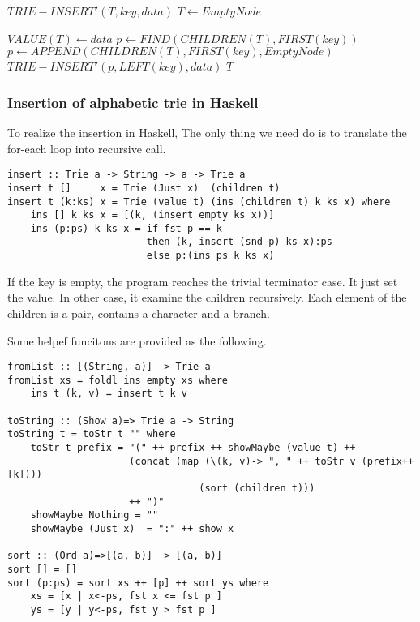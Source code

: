 \documentclass{article}
\begin{document}
\begin{algorithmic}
\STATE $TRIE-INSERT'(T, key, data)$
  \STATE $T \leftarrow EmptyNode$ \ENDIF

  \STATE $VALUE(T) \leftarrow data$
\ELSE
  \STATE $p \leftarrow FIND(CHILDREN(T), FIRST(key))$
    \STATE $p \leftarrow APPEND(CHILDREN(T), FIRST(key), EmptyNode)$
  \ENDIF
  \STATE $TRIE-INSERT'(p, LEFT(key), data)$
\ENDIF
\RETURN $T$
\end{algorithmic}

\subsubsection*{Insertion of alphabetic trie in Haskell}
To realize the insertion in Haskell, The only thing we need do is
to translate the for-each loop into recursive call. 

\lstset{language=Haskell}
\begin{lstlisting}
insert :: Trie a -> String -> a -> Trie a
insert t []     x = Trie (Just x)  (children t)
insert t (k:ks) x = Trie (value t) (ins (children t) k ks x) where
    ins [] k ks x = [(k, (insert empty ks x))]
    ins (p:ps) k ks x = if fst p == k 
                        then (k, insert (snd p) ks x):ps
                        else p:(ins ps k ks x)
\end{lstlisting}

If the key is empty, the program reaches the trivial terminator case.
It just set the value. In other case, it examine the children recursively.
Each element of the children is a pair, contains a character and
a branch. 

Some helpef funcitons are provided as the following.

\begin{lstlisting}
fromList :: [(String, a)] -> Trie a
fromList xs = foldl ins empty xs where
    ins t (k, v) = insert t k v

toString :: (Show a)=> Trie a -> String
toString t = toStr t "" where
    toStr t prefix = "(" ++ prefix ++ showMaybe (value t) ++ 
                     (concat (map (\(k, v)-> ", " ++ toStr v (prefix++[k])))
                                 (sort (children t)))
                     ++ ")"
    showMaybe Nothing = ""
    showMaybe (Just x)  = ":" ++ show x

sort :: (Ord a)=>[(a, b)] -> [(a, b)]
sort [] = []
sort (p:ps) = sort xs ++ [p] ++ sort ys where
    xs = [x | x<-ps, fst x <= fst p ]
    ys = [y | y<-ps, fst y > fst p ]
\end{lstlisting}
\end{document}
